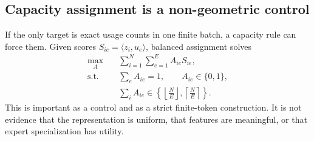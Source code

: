 \subsection{Capacity assignment is a non-geometric control}

If the only target is exact usage counts in one finite batch, a capacity rule
can force them. Given scores $S_{ie}=\langle z_i,u_e\rangle$, balanced
assignment solves
\begin{align}
 \max_A \quad & \sum_{i=1}^N\sum_{e=1}^E A_{ie}S_{ie}, \\
 \text{s.t.}\quad & \sum_e A_{ie}=1,\qquad A_{ie}\in\{0,1\},\\
 & \sum_i A_{ie}\in
 \left\{\left\lfloor\frac{N}{E}\right\rfloor,
 \left\lceil\frac{N}{E}\right\rceil\right\}.
\end{align}
This is important as a control and as a strict finite-token construction. It is
not evidence that the representation is uniform, that features are meaningful,
or that expert specialization has utility.
